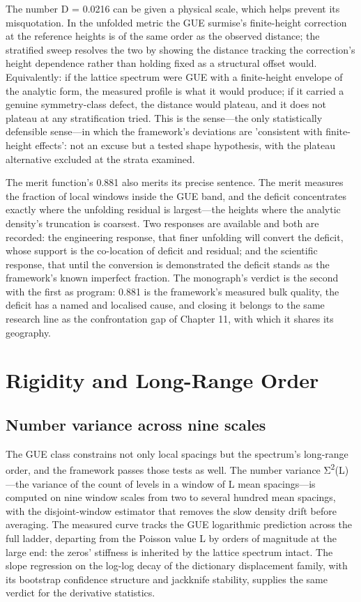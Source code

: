 \documentclass[10pt]{article}
\begin{document}
The number D = 0.0216 can be given a physical scale, which helps prevent its misquotation. In the unfolded metric the GUE surmise's finite-height correction at the reference heights is of the same order as the observed distance; the stratified sweep resolves the two by showing the distance tracking the correction's height dependence rather than holding fixed as a structural offset would. Equivalently: if the lattice spectrum were GUE with a finite-height envelope of the analytic form, the measured profile is what it would produce; if it carried a genuine symmetry-class defect, the distance would plateau, and it does not plateau at any stratification tried. This is the sense---the only statistically defensible sense---in which the framework's deviations are 'consistent with finite-height effects': not an excuse but a tested shape hypothesis, with the plateau alternative excluded at the strata examined.

The merit function's 0.881 also merits its precise sentence. The merit measures the fraction of local windows inside the GUE band, and the deficit concentrates exactly where the unfolding residual is largest---the heights where the analytic density's truncation is coarsest. Two responses are available and both are recorded: the engineering response, that finer unfolding will convert the deficit, whose support is the co-location of deficit and residual; and the scientific response, that until the conversion is demonstrated the deficit stands as the framework's known imperfect fraction. The monograph's verdict is the second with the first as program: 0.881 is the framework's measured bulk quality, the deficit has a named and localised cause, and closing it belongs to the same research line as the confrontation gap of Chapter 11, with which it shares its geography.

\section{Rigidity and Long-Range Order}\label{sec:ch9}
\subsection{Number variance across nine scales}\label{sec:91}
The GUE class constrains not only local spacings but the spectrum's long-range order, and the framework passes those tests as well. The number variance Σ\textsuperscript{2}(L)---the variance of the count of levels in a window of L mean spacings---is computed on nine window scales from two to several hundred mean spacings, with the disjoint-window estimator that removes the slow density drift before averaging. The measured curve tracks the GUE logarithmic prediction across the full ladder, departing from the Poisson value L by orders of magnitude at the large end: the zeros' stiffness is inherited by the lattice spectrum intact. The slope regression on the log-log decay of the dictionary displacement family, with its bootstrap confidence structure and jackknife stability, supplies the same verdict for the derivative statistics.
\end{document}
